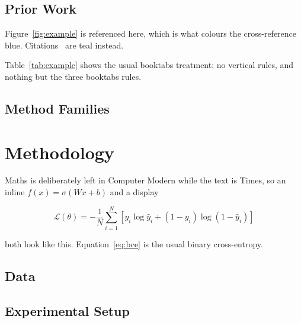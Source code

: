 \documentclass[11pt,twoside,openany]{report}
\begin{document}
\lipsum[9]



\section{Prior Work}

Figure~\ref{fig:example} is referenced here, which is what colours the
cross-reference blue. Citations~\citep{chen2025preprint} are teal instead.

\lipsum[10]



Table~\ref{tab:example} shows the usual booktabs treatment: no vertical rules,
and nothing but the three booktabs rules.

\lipsum[11]

\section{Method Families}



\lipsum[12]

\chapter{Methodology}

Maths is deliberately left in Computer Modern while the text is Times, so an
inline $f(x) = \sigma(Wx + b)$ and a display

\begin{equation}
  \mathcal{L}(\theta) = -\frac{1}{N} \sum_{i=1}^{N}
    \left[ y_i \log \hat{y}_i + (1 - y_i) \log (1 - \hat{y}_i) \right]
  \label{eq:bce}
\end{equation}

both look like this. Equation~\eqref{eq:bce} is the usual binary cross-entropy.

\lipsum[13]

\section{Data}

\lipsum[14]

\section{Experimental Setup}
\end{document}
